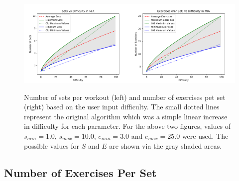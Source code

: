 \begin{figure}[h]
	\centering
	\includegraphics[width=0.5\textwidth]{Images/Svd.png}\includegraphics[width=0.5\textwidth]{Images/Evd.png}
	\caption{Number of sets per workout (left) and number of exercises pet set (right) based on the user input difficulty. The small dotted lines represent the original algorithm which was a simple linear increase in difficulty for each parameter. For the above two figures, values of $s_{min}=1.0$, $s_{max} = 10.0$, $e_{min}=3.0$ and $e_{max}=25.0$ were used. The possible values for $S$ and $E$ are shown via the gray shaded areas.} \label{Svd and Evd}
\end{figure}

\subsection{Number of Exercises Per Set}

